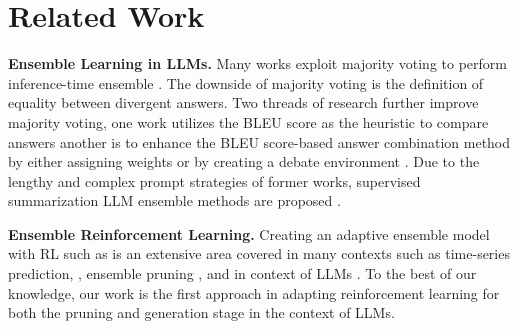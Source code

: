 \section{Related Work}
\vspace{-4pt}
\textbf{Ensemble Learning in LLMs.} Many works exploit majority voting to perform inference-time ensemble  \cite{wang2022self, fu2022complexity, li2022advance, wang2022rationale}. The downside of majority voting is the definition of equality between divergent answers. %
Two threads of research further improve majority voting, one work utilizes the BLEU score as the heuristic to compare answers \cite{li2024more} another is to enhance the BLEU score-based answer combination method by either assigning weights \citep{yao2024tree} or by creating a debate environment \citep{liang2023encouraging, wan2024knowledge, du2023improving, chan2023chateval}. Due to the lengthy and complex prompt strategies of former works, supervised summarization LLM ensemble methods are proposed \cite{jiang2023llm, tekin-etal-2024-llm}.

\textbf{Ensemble Reinforcement Learning.} Creating an adaptive ensemble model with RL such as \cite{song2023ensemble, chua2018deep} is an extensive area covered in many contexts such as time-series prediction, \cite{liu2020new, nemeth2022split, perepu2020reinforcement}, ensemble pruning \cite{partalas2009pruning, liu2020instance}, and in context of LLMs \cite{ouyang2022training, liu2024rl, monea2024llms, zhang2021multi, sun2024llm, liu2024dynamic}. To the best of our knowledge, our work is the first approach in adapting reinforcement learning for both the pruning and generation stage in the context of LLMs.